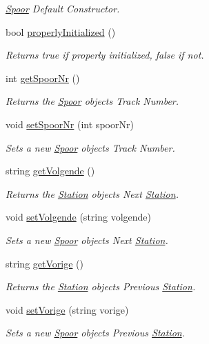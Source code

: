 \begin{DoxyCompactItemize}
\begin{DoxyCompactList}\small\item\em \hyperlink{classSpoor}{Spoor} Default Constructor. \end{DoxyCompactList}\item 
bool \hyperlink{classSpoor_a31982084b33e5946f1e15844b084f62f}{properly\+Initialized} ()
\begin{DoxyCompactList}\small\item\em Returns true if properly initialized, false if not. \end{DoxyCompactList}\item 
int \hyperlink{classSpoor_a17c71f600581bc91b85c92d6628d14c5}{get\+Spoor\+Nr} ()
\begin{DoxyCompactList}\small\item\em Returns the \hyperlink{classSpoor}{Spoor} object\textquotesingle{}s Track Number. \end{DoxyCompactList}\item 
void \hyperlink{classSpoor_af0c947d95aafed41f4fa3c5ec96d2e3c}{set\+Spoor\+Nr} (int spoor\+Nr)
\begin{DoxyCompactList}\small\item\em Sets a new \hyperlink{classSpoor}{Spoor} object\textquotesingle{}s Track Number. \end{DoxyCompactList}\item 
string \hyperlink{classSpoor_af72fa63d73e10bb5d0bb0e15958260d5}{get\+Volgende} ()
\begin{DoxyCompactList}\small\item\em Returns the \hyperlink{classStation}{Station} object\textquotesingle{}s Next \hyperlink{classStation}{Station}. \end{DoxyCompactList}\item 
void \hyperlink{classSpoor_a3f372480028541bed83821716b90da58}{set\+Volgende} (string volgende)
\begin{DoxyCompactList}\small\item\em Sets a new \hyperlink{classSpoor}{Spoor} object\textquotesingle{}s Next \hyperlink{classStation}{Station}. \end{DoxyCompactList}\item 
string \hyperlink{classSpoor_a4c9a290c147e08e5734c662c73b9793c}{get\+Vorige} ()
\begin{DoxyCompactList}\small\item\em Returns the \hyperlink{classStation}{Station} object\textquotesingle{}s Previous \hyperlink{classStation}{Station}. \end{DoxyCompactList}\item 
void \hyperlink{classSpoor_a7f6d776cfd20986866011f1a42a6c762}{set\+Vorige} (string vorige)
\begin{DoxyCompactList}\small\item\em Sets a new \hyperlink{classSpoor}{Spoor} object\textquotesingle{}s Previous \hyperlink{classStation}{Station}. \end{DoxyCompactList}\end{DoxyCompactItemize}


